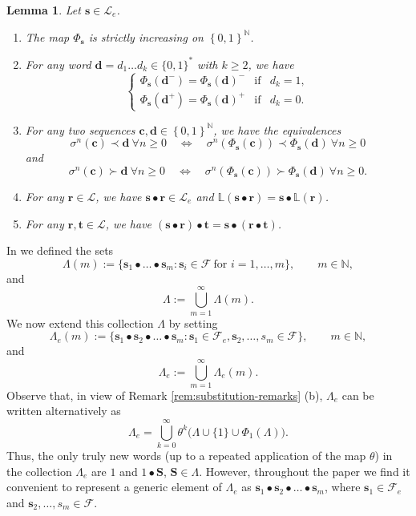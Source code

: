 \documentclass[12pt]{amsart}
\newtheorem{lemma}[theorem]{Lemma}
\theoremstyle{definition}
\theoremstyle{remark}
\numberwithin{equation}{section}
\newcommand{\N}{\ensuremath{\mathbb{N}}}
\renewcommand{\L}{\ensuremath{\mathbb{L}}}
\newcommand{\cF}{\mathcal{F}}
\newcommand{\cL}{\mathcal{L}}
\renewcommand{\c}{ {\mathbf{c}}}
\renewcommand{\d}{ {\mathbf{d}}}
\renewcommand{\t}{ {\mathbf{t}}}
\newcommand{\s}{ {\mathbf{s}}}
\newcommand{\cs}{ {\mathbf{S}}}
\renewcommand{\r}{ {\mathbf{r}}}
\newcommand{\set}[1]{\left\{#1\right\}}
\newcommand{\f}{\infty}
\newcommand{\si}{\sigma}
\newcommand{\La}{\Lambda}
\begin{document}
{\begin{lemma} \label{lem:substitution-properties}
Let $\s\in\cL_e$.
\begin{enumerate}[{\rm(i)}]
\item The map $\Phi_\s$ is strictly increasing on $\set{0,1}^\N$.
\item For any  word $\d=d_1\ldots d_k\in \{0,1\}^*$ with $k\ge 2$, we have
\[
\left\{
\begin{array}{lll}
\Phi_\s(\d^-)=\Phi_\s(\d)^-&\textrm{if}& d_k=1,\\
\Phi_\s(\d^+)=\Phi_\s(\d)^+&\textrm{if}& d_k=0.
\end{array}\right.
\]
\item For any two sequences $\c,\d\in\set{0,1}^\N$, we have the equivalences
\[
\si^n(\c)\prec \d~\forall n\ge 0\quad\Longleftrightarrow\quad \si^n(\Phi_\s(\c))\prec \Phi_\s(\d)~\forall n\ge 0
\]
and
\[
\si^n(\c)\succ \d~\forall n\ge 0\quad\Longleftrightarrow\quad \si^n(\Phi_\s(\c))\succ \Phi_\s(\d)~\forall n\ge 0.
\]
\item For any $\r\in\cL$, we have $\s\bullet\r\in\cL_e$ and $\L(\s\bullet\r)=\s\bullet\L(\r)$.
\item For any $\r,\t\in\cL$, we have $(\s\bullet\r)\bullet\t=\s\bullet(\r\bullet\t)$.
\end{enumerate}
\end{lemma}

In \cite{Allaart-Kong-2021} we defined the sets
\[
\La(m):=\{\s_1\bullet\dots\bullet\s_m: \s_i\in \cF\ \mbox{for $i=1,\dots,m$}\}, \qquad m\in\N,
\]
and
\begin{equation} \label{eq:Lambda}
\La:=\bigcup_{m=1}^\f \La(m).
\end{equation}
We now extend this collection $\Lambda$ by setting
\[
\Lambda_e(m):=\{\s_1\bullet\s_2\bullet\dots\bullet \s_m: \s_1\in \cF_e, \s_2,\dots,s_m\in \cF\}, \qquad m\in\N,
\]
and
\begin{equation} \label{eq:Lambda_e}
\Lambda_e:=\bigcup_{m=1}^\f \Lambda_e(m).
\end{equation}
Observe that, in view of Remark \ref{rem:substitution-remarks} (b), $\Lambda_e$ can be written alternatively as
\[
\Lambda_e=\bigcup_{k=0}^\f \theta^k\big(\Lambda\cup \{1\} \cup \Phi_1(\Lambda)\big).
\]
Thus, the only truly new words (up to a repeated application of the map $\theta$) in the collection $\Lambda_e$ are $1$ and $1\bullet\cs$, $\cs\in\Lambda$.
However, throughout the paper we find it convenient to represent a generic element of $\Lambda_e$ as $\s_1\bullet\s_2\bullet\dots\bullet \s_m$, where $\s_1\in \cF_e$ and $\s_2,\dots,s_m\in \cF$.

}
\end{document}
